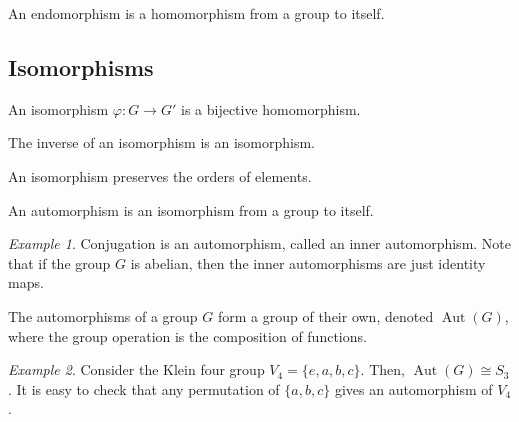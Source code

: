 \documentclass[11pt]{article}
\newcommand{\aut}{\operatorname{Aut}}
\theoremstyle{definition}
\theoremstyle{remark}
\newtheorem*{example}{Example}
\numberwithin{equation}{section}
\begin{document}
    \begin{definition}
        An endomorphism is a homomorphism from a group to itself.
    \end{definition}

    \subsection{Isomorphisms}
    \begin{definition}
        An isomorphism $\varphi\colon G \to G'$ is a bijective homomorphism.
    \end{definition}

    \begin{lemma}
        The inverse of an isomorphism is an isomorphism.
    \end{lemma}

    \begin{lemma}
        An isomorphism preserves the orders of elements.
    \end{lemma}

    \begin{definition}
        An automorphism is an isomorphism from a group to itself.
    \end{definition}

    \begin{example}
        Conjugation is an automorphism, called an inner automorphism. Note that if
        the group $G$ is abelian, then the inner automorphisms are just identity maps.
    \end{example}

    \begin{lemma}
        The automorphisms of a group $G$ form a group of their own, denoted
        $\aut(G)$, where the group operation is the composition of functions.
    \end{lemma}

    \begin{example}
        Consider the Klein four group $V_4 = \{e, a, b, c\}$. Then, $\aut(G) \cong
        S_3$. It is easy to check that any permutation of $\{a, b, c\}$ gives an
        automorphism of $V_4$.
    \end{example}
    
\end{document}
